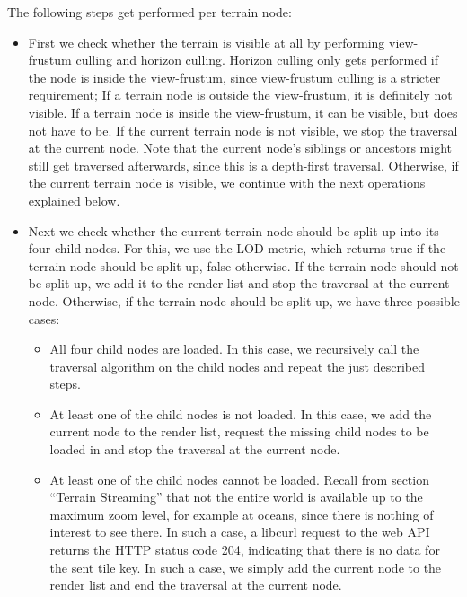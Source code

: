 The following steps get performed per terrain node:
\begin{itemize}
  \item First we check whether the terrain is visible at all 
  by performing view-frustum culling and horizon culling.
  Horizon culling only gets performed if the node is inside
  the view-frustum, since view-frustum culling is a stricter requirement; 
  If a terrain node is outside the view-frustum, it is definitely 
  not visible. If a terrain node is inside the view-frustum,
  it can be visible, but does not have to be.
  If the current terrain node is not visible, we stop the traversal 
  at the current node. Note that the current node's siblings or ancestors might still get traversed afterwards,
  since this is a depth-first traversal.
  Otherwise, if the current terrain node is visible, we continue with the next operations explained below.
  \item Next we check whether the current terrain node should be split up into 
        its four child nodes. For this, we use the LOD metric, which returns true 
        if the terrain node should be split up, false otherwise.
        If the terrain node should not be split up, we add it to the 
        render list and stop the traversal at the current node.
        Otherwise, if the terrain node should be split up, we have three possible cases:
        \begin{itemize}
          \item All four child nodes are loaded. In this case, we recursively call 
                the traversal algorithm on the child nodes and repeat the just described steps.
          \item At least one of the child nodes is not loaded. In this case, we add the current node to the render list, 
                request the missing child nodes to be loaded in and stop the traversal at the current node.
          \item At least one of the child nodes cannot be loaded. Recall from 
                section ``Terrain Streaming'' that not the entire world is available 
                up to the maximum zoom level, for example at oceans, since there 
                is nothing of interest to see there.
                In such a case, a libcurl request to the web API 
                returns the HTTP status code 204,
                indicating that there is no data for the sent tile key.
                In such a case, we simply add the current node to the render list and
                 end the traversal at the current node.
        \end{itemize}
\end{itemize}

